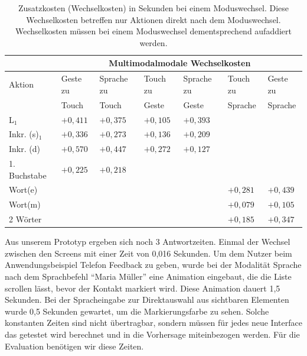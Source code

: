 \begin{table}[ht]
  \centering
		\begin{tabular}{|l|l|l|l|l|l|l|}
				\hline
				& \multicolumn{6}{|c|}{Multimodalmodale Wechselkosten}\\
				\hline
				Aktion 					& Geste zu		& Sprache zu 	& Touch zu		& Sprache zu		& Touch zu		& Geste zu\\
												& Touch 			& Touch 			& Geste 			& Geste					& Sprache 		& Sprache \\
				\hline
				L$_1$ 					& ${+0,411}$ 	&	${+0,375}$	& ${+0,105}$ 	&	${+0,393}$		& \multicolumn{2}{|c|}{}	\\
				\hline
				Inkr. (s)$_1$		& ${+0,336}$ 	&	${+0,273}$ 	& ${+0,136}$ 	&	${+0,209}$		& \multicolumn{2}{|c|}{}	\\
				\hline
				Inkr. (d) 					& ${+0,570}$ 	&	${+0,447}$ 	& ${+0,272}$ 	&	${+0,127}$		& \multicolumn{2}{|c|}{}	\\		
				\hline
				1. Buchstabe		& ${+0,225}$ 	& ${+0,218}$ 	&	\multicolumn{2}{|c|}{}			& \multicolumn{2}{|c|}{}	\\
				\hline
				Wort(e) 	& \multicolumn{2}{|c|}{}	& \multicolumn{2}{|c|}{}				& ${+0,281}$ 		& ${+0,439}$\\			
				\hline
				Wort(m)	& \multicolumn{2}{|c|}{}	& \multicolumn{2}{|c|}{}				& ${+0,079}$ 		& ${+0,105}$\\	
				\hline					
				2 Wörter 				& \multicolumn{2}{|c|}{}	& \multicolumn{2}{|c|}{}				& ${+0,185}$ 		& ${+0,347}$\\	
				\hline	
			\end{tabular}
	\caption[Wechselkosten eines Moduswechsels]{Zusatzkosten (Wechselkosten) in Sekunden bei einem Moduswechsel. Diese Wechselkosten betreffen nur Aktionen direkt nach dem Moduswechsel. Wechselkosten müssen bei einem Moduswechsel dementsprechend aufaddiert werden.}
	\label{tab:Wechselkosten}
\end{table}

Aus unserem Prototyp ergeben sich noch 3 Antwortzeiten. Einmal der Wechsel zwischen den Screens mit einer Zeit von 0,016 Sekunden. Um dem Nutzer beim Anwendungsbeispiel Telefon Feedback zu geben, wurde bei der Modalität Sprache nach dem Sprachbefehl "`Maria Müller"' eine Animation eingebaut, die die Liste scrollen lässt, bevor der Kontakt markiert wird. Diese Animation dauert 1,5 Sekunden. Bei der Spracheingabe zur Direktauswahl aus sichtbaren Elementen wurde 0,5 Sekunden gewartet, um die Markierungsfarbe zu sehen. 
Solche konstanten Zeiten sind nicht übertragbar, sondern müssen für jedes neue Interface das getestet wird berechnet und in die Vorhersage miteinbezogen werden. Für die Evaluation benötigen wir diese Zeiten.

